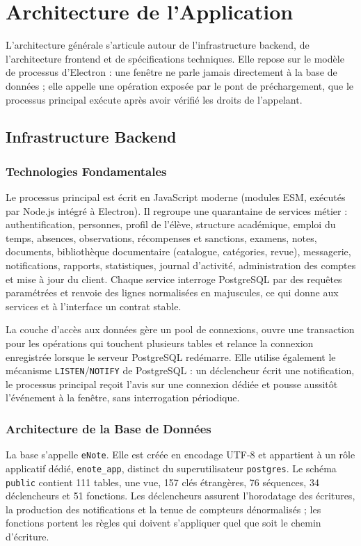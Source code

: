 \section{Architecture de l'Application}
L'architecture générale s'articule autour de l'infrastructure backend, de l'architecture frontend et de
spécifications techniques. Elle repose sur le modèle de processus d'Electron : une fenêtre ne parle
jamais directement à la base de données ; elle appelle une opération exposée par le pont de
préchargement, que le processus principal exécute après avoir vérifié les droits de l'appelant.

\subsection{Infrastructure Backend}
\subsubsection{Technologies Fondamentales}
Le processus principal est écrit en JavaScript moderne (modules \ac{ESM}, exécutés par Node.js intégré à
Electron). Il regroupe une quarantaine de services métier : authentification, personnes, profil de
l'élève, structure académique, emploi du temps, absences, observations, récompenses et sanctions,
examens, notes, documents, bibliothèque documentaire (catalogue, catégories, revue), messagerie,
notifications, rapports, statistiques, journal d'activité, administration des comptes et mise à jour du
client. Chaque service interroge PostgreSQL par des
requêtes paramétrées et renvoie des lignes normalisées en majuscules, ce qui donne aux services et à
l'interface un contrat stable.

La couche d'accès aux données gère un pool de connexions, ouvre une transaction pour les opérations qui
touchent plusieurs tables et relance la connexion enregistrée lorsque le serveur PostgreSQL redémarre.
Elle utilise également le mécanisme \texttt{LISTEN}/\texttt{NOTIFY} de PostgreSQL : un déclencheur écrit
une notification, le processus principal reçoit l'avis sur une connexion dédiée et pousse aussitôt
l'événement à la fenêtre, sans interrogation périodique.

\subsubsection{Architecture de la Base de Données}
La base s'appelle \texttt{eNote}. Elle est créée en encodage \ac{UTF-8} et appartient à un rôle
applicatif dédié, \texttt{enote\_app}, distinct du superutilisateur \texttt{postgres}. Le schéma
\texttt{public} contient 111 tables, une vue, 157 clés étrangères, 76 séquences, 34 déclencheurs et
51 fonctions. Les déclencheurs assurent l'horodatage des écritures, la production des notifications
et la tenue de compteurs dénormalisés ; les fonctions portent les règles
qui doivent s'appliquer quel que soit le chemin d'écriture.

